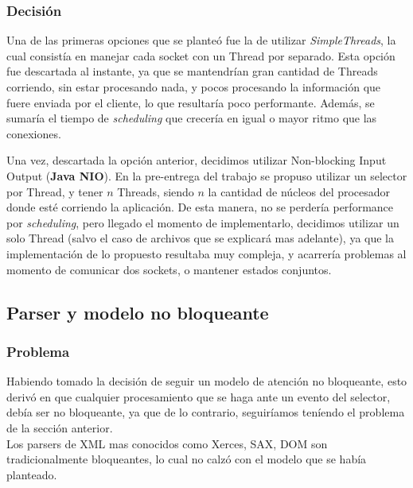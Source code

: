 \documentclass[a4paper,10pt]{article}
\begin{document}
\subsubsection{Decisión}
\par
Una de las primeras opciones que se planteó fue la de utilizar \textit{SimpleThreads}, la cual consistía
en manejar cada socket con un Thread por separado. Esta opción fue descartada al instante, ya que se mantendrían gran
cantidad de Threads corriendo, sin estar procesando nada, y pocos procesando la información que fuere enviada por el
cliente, lo que resultaría poco performante. Además, se sumaría el tiempo de \textit{scheduling} que crecería en igual o mayor ritmo
que las conexiones.
\par
Una vez, descartada la opción anterior, decidimos utilizar Non-blocking Input Output (\textbf{Java NIO}). En la pre-entrega del
trabajo se propuso utilizar un selector por Thread, y tener $n$ Threads, siendo $n$ la cantidad de núcleos del procesador donde esté
corriendo la aplicación. De esta manera, no se perdería performance por \textit{scheduling}, pero llegado el momento de implementarlo,
decidimos utilizar un solo Thread (salvo el caso de archivos que se explicará mas adelante), ya que la implementación de lo propuesto
resultaba muy compleja, y acarrería problemas al momento de comunicar dos sockets, o mantener estados conjuntos.

\subsection{Parser y modelo no bloqueante}
\subsubsection{Problema}
Habiendo tomado la decisión de seguir un modelo de atención no bloqueante, esto derivó en que cualquier procesamiento que se haga
ante un evento del selector, debía ser no bloqueante, ya que de lo contrario, seguiríamos teníendo el problema de la sección
anterior.\\
Los parsers de XML mas conocidos como Xerces, SAX, DOM son tradicionalmente bloqueantes, lo cual no calzó con el modelo que se había
planteado.
\end{document}
